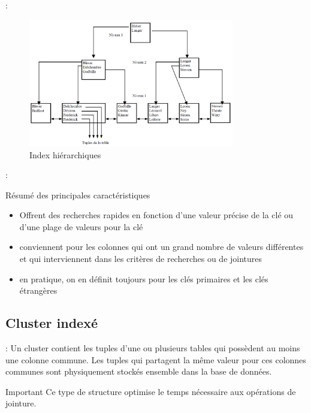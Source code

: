 \documentclass[10pt]{beamer}
\begin{document}
\begin{frame}{\secname : \subsecname}
    \begin{figure}
        \begin{center}
            \includegraphics[width=0.8\textwidth]{../assets/img/index-B-TREE.png}
            \caption*{Index hiérarchiques}
            \label{Fig:index-B-TREE}
        \end{center}
    \end{figure}
\end{frame}

\begin{frame}{\secname : \subsecname}
    \begin{alertblock}{Résumé des principales caractéristiques}
        \begin{itemize}
            \item Offrent des recherches rapides en fonction d'une valeur précise de la clé ou d'une plage de valeurs pour la clé
            \item conviennent pour les colonnes qui ont un grand nombre de valeurs différentes et qui interviennent dans les critères de recherches ou de jointures
            \item en pratique, on en définit toujours pour les clés primaires et les clés étrangères
        \end{itemize}
    \end{alertblock}
\end{frame}



\subsection{Cluster indexé}
\begin{frame}{\secname : \subsecname}
    Un cluster contient les tuples d'une ou plusieurs tables qui possèdent au moins une colonne commune.
    Les tuples qui partagent la même valeur pour ces colonnes communes sont physiquement stockés ensemble dans la base de données.

    \begin{alertblock}{Important}
        Ce type de structure optimise le temps nécessaire aux opérations de jointure.
    \end{alertblock}
    
\end{frame}
\end{document}
